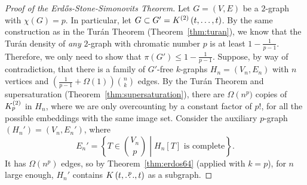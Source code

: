 \begin{proof}[Proof of the Erdős-Stone-Simonovits Theorem]
    Let $G = (V, E)$ be a $2$-graph with $\chi(G) = p$.
    In particular, let $G \subset G' = K^{(2)}\left(t, \dots, t\right)$.
    By the same construction as in the Turán Theorem (Theorem~\ref{thm:turan}),
    we know that the Turán density of \emph{any}
    $2$-graph with chromatic number $p$ is at least $1 - \frac{1}{p - 1}$.
    Therefore, we only need to show that $\pi \left( G' \right) \leq 1 - \frac{1}{p - 1}$.
    Suppose, by way of contradiction, that
    there is a family of $G'$-free $k$-graphs $H_n = (V_n, E_n)$ with $n$ vertices and
    $\left(\frac{1}{p - 1} + \Omega(1)\right) \binom{n}{k}$ edges.
    By the Turán Theorem and supersaturation (Theorem~\ref{thm:supersaturation}),
    there are $\Omega\left(n^{p})$ copies of $K^{(2)}_{p}$ in $H_n$,
    where we are only overcounting by a constant factor of $p!$, for all the possible embeddings with the same image set.
    Consider the auxiliary $p$-graph $(H_n') = (V_n, E_n')$, where
    \[
        E_n' = \left\{ T \in \binom{V_n}{p} \middle| H_n[T] \text{ is complete} \right\}.
    \]
    It has $\Omega\left(n^{p}\right)$ edges, so by Theorem~\ref{thm:erdos64} (applied with $k = p$),
    for $n$ large enough, $H_n'$ contains $K\left(t, \overset{p}{\dots}, t\right)$ as a subgraph.

\end{proof}

